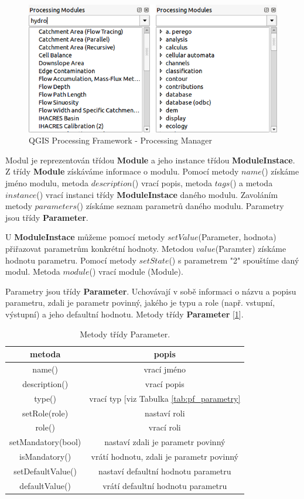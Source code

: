 \begin{figure}
	\centering
	\includegraphics[scale=0.5]{pictures/pf/processing_manager_small}
	\caption{QGIS Processing Framework - Processing Manager}
  	\label{pf:pm}
\end{figure}

Modul je reprezentován třídou \textbf{Module} a jeho instance třídou \textbf{ModuleInstace}. Z třídy \textbf{Module} získáváme informace o modulu. Pomocí metody $name$() získáme jméno modulu, metoda $description$() vrací popis, metoda $tags$() a metoda $instance$() vrací instanci třídy \textbf{ModuleInstace} daného modulu. Zavoláním metody $parameters$() získáme seznam parametrů daného modulu. Parametry jsou třídy \textbf{Parameter}.

U \textbf{ModuleInstace} můžeme pomocí metody $setValue$(Parameter, hodnota) přiřazovat parametrům konkrétní hodnoty. Metodou $value$(Paramter) získáme hodnotu parametru. Pomocí metody $setState$() s parametrem "2" spouštíme daný modul. Metoda $module$() vrací module (Module).

Parametry jsou třídy \textbf{Parameter}. Uchovávají v sobě informaci o názvu a popisu parametru, zdali je parametr povinný, jakého je typu a role (např. vstupní, výstupní) a jeho defaultní hodnotu. Metody třídy \textbf{Parameter} [\ref{tab:metPar}].

\begin{table}[h]
	\centering
	\begin{tabular}{|c|c|}
	\hline
	metoda & popis \\
	\hline
	\hline
	name() & vrací jméno\\
	description() & vrací popis\\
	type() & vrací typ [viz Tabulka \ref{tab:pf_parametry} \\
	setRole(role) & nastaví roli\\
	role() & vrací roli\\
	setMandatory(bool) & nastaví zdali je parametr povinný\\
	isMandatory() & vrátí hodnotu, zdali je parametr povinný\\
	setDefaultValue() & nastaví defaultní hodnotu parametru\\
	defaultValue() & vrátí defaultní hodnotu parametru \\
	\hline
	\end{tabular}
	\caption{Metody třídy Parameter.}
	\label{tab:metPar}
\end{table}

